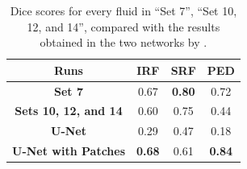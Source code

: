 \begin{table}[!ht]
	\caption{Dice scores for every fluid in ``Set 7'', ``Set 10, 12, and 14'', compared with the results obtained in the two networks by \textcite{Alsaih2020}.}
	\centering
	\begin{tabular}{|c|c|c|c|}
			\hline
			\textbf{Runs} & \textbf{IRF} & 
			\textbf{SRF} & 
			\textbf{PED} \\
						
			\hline
			
			\textbf{Set 7} & 0.67 & \textbf{0.80} & 0.72 \\
			
			\hline
			
			\textbf{Sets 10, 12, and 14} & 0.60 & 0.75 & 0.44 \\
			
			\hline
			\hline
			
			\textbf{U-Net \parencite{Alsaih2020}} & 0.29 & 0.47 & 0.18 \\
			
			\hline
			
			\textbf{U-Net with Patches \parencite{Alsaih2020}} & \textbf{0.68} & 0.61 & \textbf{0.84} \\
			
			\hline
			
	\end{tabular}
	\label{tab:Experiment1VsExperiment2VsLiterature}
\end{table}

